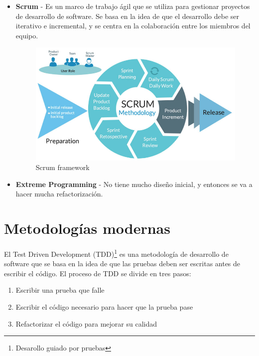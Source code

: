 \begin{itemize}
   \begin{itemize}
      \item \textbf{Scrum} - Es un marco de trabajo ágil que se utiliza para gestionar proyectos de desarrollo de software. Se basa en la idea de que el desarrollo debe ser iterativo e incremental, y se centra en la colaboración entre los miembros del equipo.
      \begin{figure}[htbp]
         \centering
         \includegraphics{images/07/scrum.jpg}
         \caption{Scrum framework}
         \label{fig:scrum}
      \end{figure}
      \item \textbf{Extreme Programming} - No tiene mucho diseño inicial, y entonces se va a hacer mucha refactorización.
   \end{itemize}
\end{itemize}


\section{Metodologías modernas}

El Test Driven Development (TDD)\footnote{Desarollo guiado por pruebas} es una metodología de desarrollo de software que se basa en la idea de que las pruebas deben ser escritas antes de escribir el código. El proceso de TDD se divide en tres pasos:
\begin{enumerate}
   \item Escribir una prueba que falle
   \item Escribir el código necesario para hacer que la prueba pase
   \item Refactorizar el código para mejorar su calidad
\end{enumerate}

